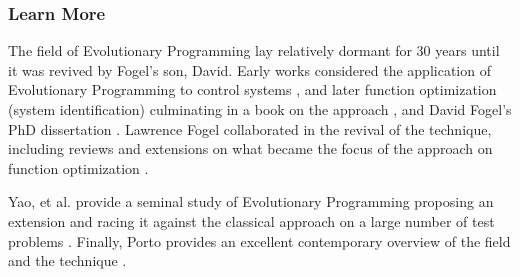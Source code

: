% 
% 
\subsubsection{Learn More}
The field of Evolutionary Programming lay relatively dormant for 30 years until it was revived by Fogel's son, David. Early works considered the application of Evolutionary Programming to control systems \cite{Sebald1990}, and later function optimization (system identification) culminating in a book on the approach \cite{Fogel1991}, and David Fogel's PhD dissertation \cite{Fogel1992}.
Lawrence Fogel collaborated in the revival of the technique, including reviews \cite{Fogel1990, Fogel1994} and extensions on what became the focus of the approach on function optimization \cite{Fogel1991a}.

Yao, et al. provide a seminal study of Evolutionary Programming proposing an extension and racing it against the classical approach on a large number of test problems \cite{Yao1999}. Finally, Porto provides an excellent contemporary overview of the field and the technique \cite{Porto2000}.


